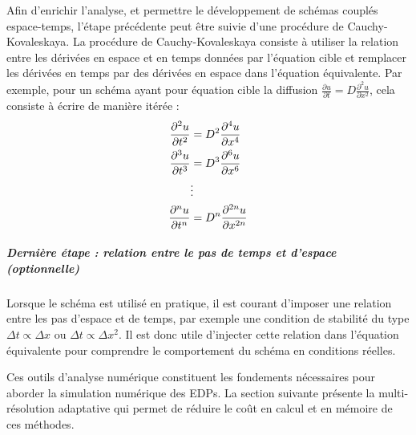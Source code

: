         Afin d'enrichir l'analyse, et permettre le développement de schémas couplés espace-temps, l'étape précédente peut être suivie d'une procédure de Cauchy-Kovaleskaya.
        La procédure de Cauchy-Kovaleskaya consiste à utiliser la relation entre les dérivées en espace et en temps données par l'équation cible et remplacer les dérivées en temps par des dérivées en espace dans l'équation équivalente.
        Par exemple, pour un schéma ayant pour équation cible la diffusion $\frac{\partial u}{\partial t} = D \frac{\partial^2 u}{\partial x^2}$, cela consiste à écrire de manière itérée :
        \begin{align}
        \frac{\partial^2 u}{\partial t^2} &= D^2 \frac{\partial^4 u}{\partial x^4} \notag \\
        \frac{\partial^3 u}{\partial t^3} &= D^3 \frac{\partial^6 u}{\partial x^6} \notag \\
        &\vdots \notag \\
        \frac{\partial^n u}{\partial t^n} &= D^n \frac{\partial^{2n} u}{\partial x^{2n}}
        \end{align}

        \subparagraph{Dernière étape : relation entre le pas de temps et d'espace (optionnelle)}

        Lorsque le schéma est utilisé en pratique, il est courant d'imposer une relation entre les pas d'espace et de temps, par exemple une condition de stabilité du type
        $\Delta t \propto \Delta x$ ou $\Delta t \propto \Delta x^2$.
        Il est donc utile d'injecter cette relation dans l'équation équivalente pour comprendre le comportement du schéma en conditions réelles.

        Ces outils d'analyse numérique constituent les fondements nécessaires pour aborder la simulation numérique des EDPs. La section suivante présente la multi-résolution adaptative qui permet de réduire le coût en calcul et en mémoire de ces méthodes.